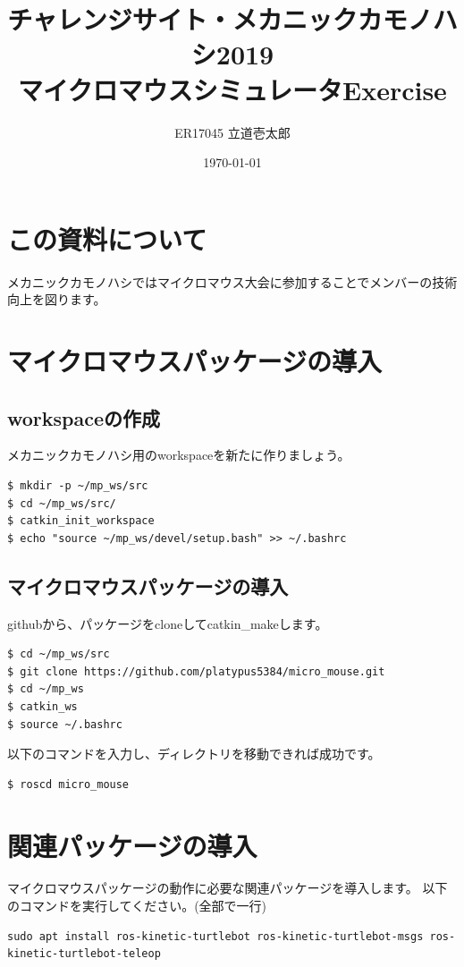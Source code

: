 \documentclass[11pt,a4paper]{jsarticle}
\title{チャレンジサイト・メカニックカモノハシ2019\\マイクロマウスシミュレータExercise}
\author{ER17045 立道壱太郎}
\date{\today}
\begin{document}
\maketitle
%
%
\section{この資料について}
メカニックカモノハシではマイクロマウス大会に参加することでメンバーの技術向上を図ります。


\section{マイクロマウスパッケージの導入}

\subsection{workspaceの作成}
メカニックカモノハシ用のworkspaceを新たに作りましょう。

\begin{lstlisting}[frame=single, caption=workspaceの作成, label=create_workspace]
$ mkdir -p ~/mp_ws/src
$ cd ~/mp_ws/src/
$ catkin_init_workspace
$ echo "source ~/mp_ws/devel/setup.bash" >> ~/.bashrc
\end{lstlisting}


\subsection{マイクロマウスパッケージの導入}
githubから、パッケージをcloneしてcatkin\_makeします。
\begin{lstlisting}[frame=single, caption=catkin\_make, label=catkin_make]
$ cd ~/mp_ws/src
$ git clone https://github.com/platypus5384/micro_mouse.git
$ cd ~/mp_ws
$ catkin_ws
$ source ~/.bashrc
\end{lstlisting}

以下のコマンドを入力し、ディレクトリを移動できれば成功です。
\begin{lstlisting}[frame=single, caption=roscd, label=roscd]
$ roscd micro_mouse
\end{lstlisting}


\newpage

\section{関連パッケージの導入}
マイクロマウスパッケージの動作に必要な関連パッケージを導入します。
以下のコマンドを実行してください。(全部で一行)
\begin{lstlisting}[frame=single, caption=roscd, label=roscd]
sudo apt install ros-kinetic-turtlebot ros-kinetic-turtlebot-msgs ros-kinetic-turtlebot-teleop 
\end{lstlisting}
\end{document}
